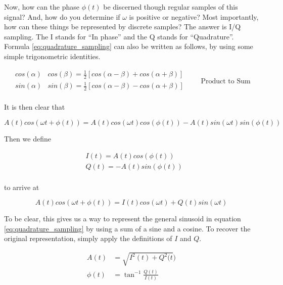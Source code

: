 \documentclass[a4paper, 12pt, notitlepage]{article}
\begin{document}
Now, how can the phase $\phi(t)$ be discerned though regular samples of this signal?  And, how do you determine if $\omega$ is positive or negative?  Most importantly, how can these things be represented by discrete samples?  The answer is I/Q sampling.  The I stands for ``In phase'' and the Q stands for ``Quadrature''.  Formula \ref{eq:quadrature_sampling} can also be written as follows, by using some simple trigonometric identities.

\begin{equation}
\label{eq:trig_ident}
\begin{aligned}
  cos(\alpha)&cos(\beta) = \frac{1}{2}[cos(\alpha - \beta) + cos(\alpha + \beta)]\\
  sin(\alpha)&sin(\beta) = \frac{1}{2}[cos(\alpha - \beta) - cos(\alpha + \beta)]\\
\end{aligned}
\qquad \text{Product to Sum}
\end{equation}

It is then clear that

\begin{equation*} %
A(t)cos(\omega t + \phi (t)) = A(t)cos(\omega t)cos(\phi (t)) - 
A(t)sin(\omega t)sin(\phi(t))
\end{equation*}

Then we define

\begin{equation}
\label{eq:iq_defn}
\begin{aligned}
  &I(t) = A(t)cos(\phi (t))\\
  &Q(t) = -A(t)sin(\phi (t))\\
\end{aligned}
\end{equation}

to arrive at  

\begin{equation}
\label{eq:quadrature_sampling3}
A(t)cos(\omega t + \phi (t)) = I(t)cos(\omega t) + Q(t)sin(\omega t)
\end{equation}

To be clear, this gives us a way to represent the general sinusoid in equation \ref{eq:quadrature_sampling} by using a sum of a sine and a cosine.  To recover the original representation, simply apply the definitions of $I$ and $Q$.

\begin{equation}
\label{eq:quadrature_sampling4}
\begin{aligned}
A(t) &= \sqrt{I^2(t) + Q^2(t})\\
\phi(t) &= \tan^{-1}{\frac{Q(t)}{I(t)}}
\end{aligned}
\end{equation}
\end{document}
